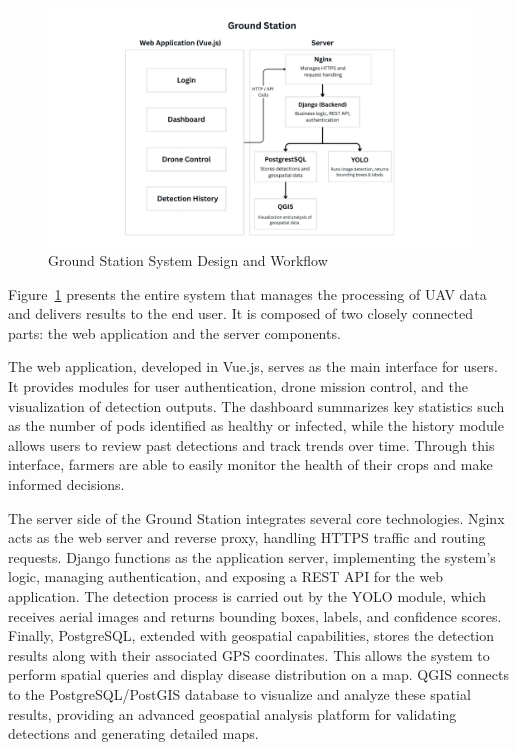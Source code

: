\begin{figure}[H]
	\centering
	\caption{Ground Station System Design and Workflow}
	\label{fig:GroundStation}
	\includegraphics[width=1\textwidth]{figures/Ground_Station.pdf}
\end{figure}

Figure~\ref{fig:GroundStation} presents the entire system that manages the processing of UAV data and delivers results to the end user. It is composed of two closely connected parts: the web application and the server components.

The web application, developed in Vue.js, serves as the main interface for users. It provides modules for user authentication, drone mission control, and the visualization of detection outputs. The dashboard summarizes key statistics such as the number of pods identified as healthy or infected, while the history module allows users to review past detections and track trends over time. Through this interface, farmers are able to easily monitor the health of their crops and make informed decisions.

The server side of the Ground Station integrates several core technologies. Nginx acts as the web server and reverse proxy, handling HTTPS traffic and routing requests. Django functions as the application server, implementing the system’s logic, managing authentication, and exposing a REST API for the web application. The detection process is carried out by the YOLO module, which receives aerial images and returns bounding boxes, labels, and confidence scores. Finally, PostgreSQL, extended with geospatial capabilities, stores the detection results along with their associated GPS coordinates. This allows the system to perform spatial queries and display disease distribution on a map. QGIS connects to the PostgreSQL/PostGIS database to visualize and analyze these spatial results, providing an advanced geospatial analysis platform for validating detections and generating detailed maps.

